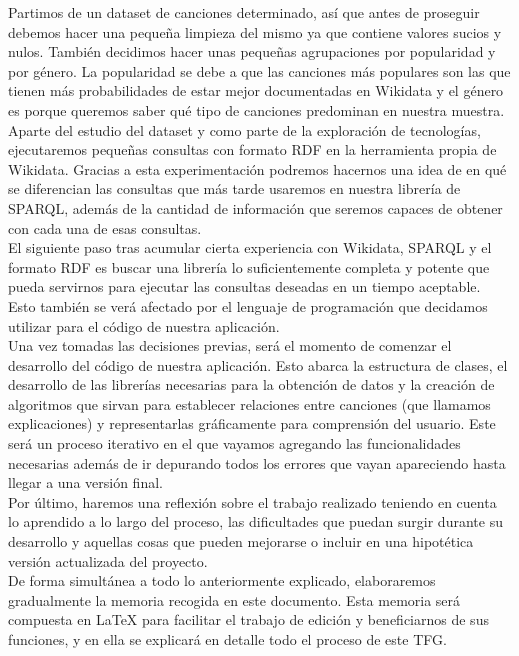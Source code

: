 Partimos de un dataset de canciones determinado, así que antes de proseguir debemos hacer una pequeña limpieza del mismo ya que contiene valores sucios y nulos. También decidimos hacer unas pequeñas agrupaciones por popularidad y por género. La popularidad se debe a que las canciones más populares son las que tienen más probabilidades de estar mejor documentadas en Wikidata y el género es porque queremos saber qué tipo de canciones predominan en nuestra muestra.\\

Aparte del estudio del dataset y como parte de la exploración de tecnologías, ejecutaremos pequeñas consultas con formato RDF en la herramienta propia de Wikidata. Gracias a esta experimentación podremos hacernos una idea de en qué se diferencian las consultas que más tarde usaremos en nuestra librería de SPARQL, además de la cantidad de información que seremos capaces de obtener con cada una de esas consultas.\\

El siguiente paso tras acumular cierta experiencia con Wikidata, SPARQL y el formato RDF es buscar una librería lo suficientemente completa y potente que pueda servirnos para ejecutar las consultas deseadas en un tiempo aceptable. Esto también se verá afectado por el lenguaje de programación que decidamos utilizar para el código de nuestra aplicación.\\

Una vez tomadas las decisiones previas, será el momento de comenzar el desarrollo del código de nuestra aplicación. Esto abarca la estructura de clases, el desarrollo de las librerías necesarias para la obtención de datos y la creación de algoritmos que sirvan para establecer relaciones entre canciones (que llamamos explicaciones) y representarlas gráficamente para comprensión del usuario. Este será un proceso iterativo en el que vayamos agregando las funcionalidades necesarias además de ir depurando todos los errores que vayan apareciendo hasta llegar a una versión final.\\

Por último, haremos una reflexión sobre el trabajo realizado teniendo en cuenta lo aprendido a lo largo del proceso, las dificultades que puedan surgir durante su desarrollo y aquellas cosas que pueden mejorarse o incluir en una hipotética versión actualizada del proyecto.\\

De forma simultánea a todo lo anteriormente explicado, elaboraremos gradualmente la memoria recogida en este documento. Esta memoria será compuesta en LaTeX para facilitar el trabajo de edición y beneficiarnos de sus funciones, y en ella se explicará en detalle todo el proceso de este TFG.\\